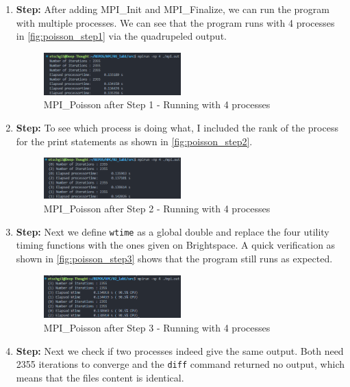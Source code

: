 \begin{enumerate}
    \item \textbf{Step:} After adding MPI\_Init and MPI\_Finalize, we can run the program with multiple processes. We can see that the program runs with 4 processes in \autoref{fig:poisson_step1} via the quadrupeled output.
    \begin{figure}[H]
        \centering
        \includegraphics[width=0.5\textwidth]{../fig/lab1/step1.png}
        \caption{MPI\_Poisson after Step 1 - Running with 4 processes}
        \label{fig:poisson_step1}
    \end{figure}
    \item \textbf{Step:} To see which process is doing what, I included the rank of the process for the print statements as shown in \autoref{fig:poisson_step2}.
    \begin{figure}[H]
        \centering
        \includegraphics[width=0.5\textwidth]{../fig/lab1/step2.png}
        \caption{MPI\_Poisson after Step 2 - Running with 4 processes}
        \label{fig:poisson_step2}
    \end{figure}
    \item \textbf{Step:} Next we define \texttt{wtime} as a global double and replace the four utility timing functions with the ones given on Brightspace. A quick verification as shown in \autoref{fig:poisson_step3} shows that the program still runs as expected.
    \begin{figure}[H]
        \centering
        \includegraphics[width=0.5\textwidth]{../fig/lab1/step3.png}
        \caption{MPI\_Poisson after Step 3 - Running with 4 processes}
        \label{fig:poisson_step3}
    \end{figure}
    \item \textbf{Step:} Next we check if two processes indeed give the same output. Both need 2355 iterations to converge and the \texttt{diff} command returned no output, which means that the files content is identical. 

\end{enumerate}
